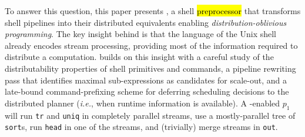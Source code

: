 \documentclass[sigplan,10pt,review,anonymous]{acmart}
\newcommand{\eg}{{\em e.g.}, }
\newcommand{\ie}{{\em i.e.}, }
\newcommand{\ttt}[1]{\texttt{\small #1}}
\newcommand{\todo}[1]{\hl{#1}\xspace}
\begin{document}
% 
% 
% 
% 
% 
% 
% 
% 



To answer this question, this paper presents \sys, a shell \todo{preprocessor} that transforms shell pipelines into their distributed equivalents enabling \emph{distribution-oblivious programming}.
The key insight behind \sys is that the language of the Unix shell already encodes stream processing, providing most of the information required to distribute a computation.
\sys builds on this insight with a careful study of the distributability properties of shell primitives and commands, a pipeline rewriting pass that identifies maximal sub-expressions as candidates for scale-out, and a late-bound command-prefixing scheme for deferring scheduling decisions to the distributed planner (\ie when runtime information is available).
A \sys-enabled $p_1$ will run \ttt{tr} and \ttt{uniq} in completely parallel streams, use a mostly-parallel tree of \ttt{sort}s, run \ttt{head} in one of the streams, and (trivially) merge streams in \ttt{out}.
\end{document}
